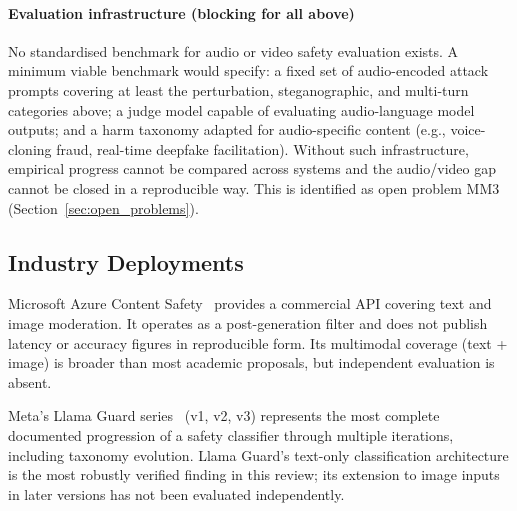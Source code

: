 \paragraph{Evaluation infrastructure (blocking for all above)}
No standardised benchmark for audio or video safety evaluation exists.
A minimum viable benchmark would specify: a fixed set of audio-encoded attack
prompts covering at least the perturbation, steganographic, and multi-turn
categories above; a judge model capable of evaluating audio-language model outputs;
and a harm taxonomy adapted for audio-specific content (e.g., voice-cloning fraud,
real-time deepfake facilitation).
Without such infrastructure, empirical progress cannot be compared across systems
and the audio/video gap cannot be closed in a reproducible way.
This is identified as open problem MM3 (Section~\ref{sec:open_problems}).

\subsection{Industry Deployments}

Microsoft Azure Content Safety~\cite{azure2024contentsafety} provides a commercial
API covering text and image moderation.
It operates as a post-generation filter and does not publish latency or accuracy
figures in reproducible form.
Its multimodal coverage (text + image) is broader than most academic proposals,
but independent evaluation is absent.

Meta's Llama Guard series~\cite{meta2024llamaguard2} (v1, v2, v3) represents the
most complete documented progression of a safety classifier through multiple
iterations, including taxonomy evolution.
Llama Guard's text-only classification architecture is the most robustly verified
finding in this review; its extension to image inputs in later versions has not been
evaluated independently.
